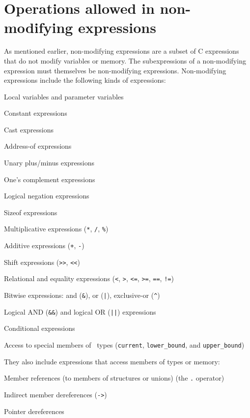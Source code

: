 \section{Operations allowed in non-modifying expressions}
\label{section:non-modifying-expressions}

As mentioned earlier, non-modifying expressions are a subset of C
expressions that do not modify variables or memory. The subexpressions
of a non-modifying expression must themselves be non-modifying
expressions. Non-modifying expressions include the following kinds of
expressions:

\begin{compactitem}
\item
  Local variables and parameter variables
\item
  Constant expressions
\item
  Cast expressions
\item
  Address-of expressions
\item
  Unary plus/minus expressions
\item
  One's complement expressions
\item
  Logical negation expressions
\item
  Sizeof expressions
\item
  Multiplicative expressions (\texttt{*}, \texttt{/}, \texttt{\%})
\item
  Additive expressions (\texttt{+}, \texttt{-})
\item
  Shift expressions (\texttt{>>}, \texttt{<<})
\item
  Relational and equality expressions (\texttt{<}, \texttt{>},
  \texttt{<=}, \texttt{>=}, \texttt{==}, \texttt{!=})
\item
  Bitwise expressions: and (\texttt{\&}), or (\texttt{|}), exclusive-or (\texttt{\^})
\item
  Logical AND (\texttt{\&\&}) and logical OR (\texttt{||}) expressions
\item
  Conditional expressions
\item
  Access to special members of \spanptr\ types
  (\texttt{current}, \texttt{lower\_bound}, and \texttt{upper\_bound})
\end{compactitem}

They also include expressions that access members of types or memory:

\begin{compactitem}
\item
  Member references (to members of structures or unions) (the \texttt{.}
  operator)
\item
  Indirect member dereferences (\texttt{->})
\item
  Pointer dereferences
\end{compactitem}

